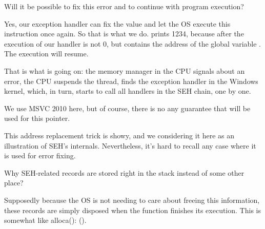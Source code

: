 

Will it be possible to fix this error  and to continue with program execution?

Yes, our exception handler can fix the \EAX value and let the \ac{OS} execute this instruction once again.
So that is what we do. \printf prints 1234, because after the execution of our handler \EAX is not 0,
but contains the address of the global variable .
The execution will resume.

That is what is going on: the memory manager in the \ac{CPU} signals about an error, the \ac{CPU} suspends the thread,
finds the exception handler in the Windows kernel, 
which, in turn, starts to call all handlers in the \ac{SEH} chain, one by one.

We use MSVC 2010 here, but of course, there is no any guarantee that \EAX will be used for this pointer.

This address replacement trick is showy, and we considering it here as an illustration of \ac{SEH}'s internals.
Nevertheless, it's hard to recall any case where it is used for  error fixing.

Why SEH-related records are stored right in the stack instead of some other place?

Supposedly because the \ac{OS} is not needing to care about freeing this information, 
these records are simply disposed when the function finishes its execution.
This is somewhat like alloca(): ().

